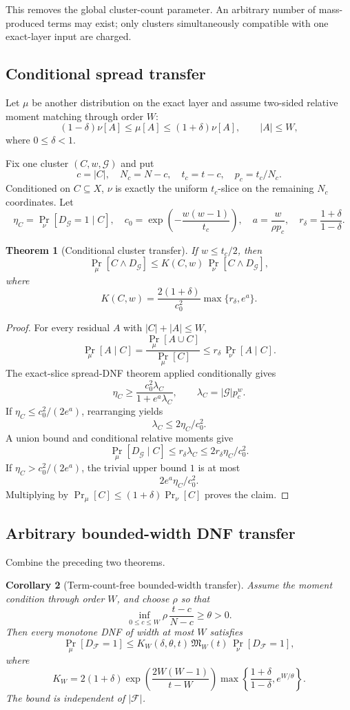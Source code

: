 \documentclass[11pt]{article}
\newtheorem{theorem}{Theorem}
\newtheorem{corollary}[theorem]{Corollary}
\begin{document}
This removes the global cluster-count parameter. An arbitrary number of mass-produced terms may exist; only clusters simultaneously compatible with one exact-layer input are charged.

\subsection{Conditional spread transfer}
Let $\mu$ be another distribution on the exact layer and assume two-sided relative moment matching through order $W$:
\[
(1-\delta)\nu[A]\le\mu[A]\le(1+\delta)\nu[A],
\qquad |A|\le W,
\]
where $0\le\delta<1$.

Fix one cluster $(C,w,\mathcal G)$ and put
\[
c=|C|,\quad
N_c=N-c,\quad
t_c=t-c,\quad
p_c=t_c/N_c.
\]
Conditioned on $C\subseteq X$, $\nu$ is exactly the uniform $t_c$-slice on the remaining $N_c$ coordinates. Let
\[
\eta_C=\Pr_{\nu}[D_{\mathcal G}=1\mid C],
\quad
c_0=\exp\!\left(-\frac{w(w-1)}{t_c}\right),
\quad
a=\frac{w}{\rho p_c},
\quad
r_\delta=\frac{1+\delta}{1-\delta}.
\]

\begin{theorem}[Conditional cluster transfer]
If $w\le t_c/2$, then
\[
\Pr_\mu[C\wedge D_{\mathcal G}]
\le
K(C,w)\,
\Pr_\nu[C\wedge D_{\mathcal G}],
\]
where
\[
K(C,w)
=
\frac{2(1+\delta)}{c_0^2}
\max\{r_\delta,e^a\}.
\]
\end{theorem}
\begin{proof}
For every residual $A$ with $|C|+|A|\le W$,
\[
\Pr_\mu[A\mid C]
=
\frac{\Pr_\mu[A\cup C]}{\Pr_\mu[C]}
\le
r_\delta\,\Pr_\nu[A\mid C].
\]
The exact-slice spread-DNF theorem applied conditionally gives
\[
\eta_C\ge\frac{c_0^2\lambda_C}{1+e^a\lambda_C},
\qquad
\lambda_C=|\mathcal G|p_c^w.
\]
If $\eta_C\le c_0^2/(2e^a)$, rearranging yields
\[
\lambda_C\le 2\eta_C/c_0^2.
\]
A union bound and conditional relative moments give
\[
\Pr_\mu[D_{\mathcal G}\mid C]
\le r_\delta\lambda_C
\le 2r_\delta\eta_C/c_0^2.
\]
If $\eta_C>c_0^2/(2e^a)$, the trivial upper bound $1$ is at most
\[
2e^a\eta_C/c_0^2.
\]
Multiplying by $\Pr_\mu[C]\le(1+\delta)\Pr_\nu[C]$ proves the claim.
\end{proof}

\subsection{Arbitrary bounded-width DNF transfer}
Combine the preceding two theorems.

\begin{corollary}[Term-count-free bounded-width transfer]
Assume the moment condition through order $W$, and choose $\rho$ so that
\[
\inf_{0\le c\le W}\rho\,\frac{t-c}{N-c}\ge\theta>0.
\]
Then every monotone DNF of width at most $W$ satisfies
\[
\boxed{
\Pr_\mu[D_{\mathcal F}=1]
\le
K_W(\delta,\theta,t)\,
\mathfrak M_W(t)\,
\Pr_\nu[D_{\mathcal F}=1],
}
\]
where
\[
K_W
=
2(1+\delta)
\exp\!\left(\frac{2W(W-1)}{t-W}\right)
\max\!\left\{\frac{1+\delta}{1-\delta},e^{W/\theta}\right\}.
\]
The bound is independent of $|\mathcal F|$.
\end{corollary}
\end{document}
